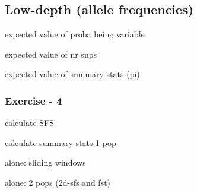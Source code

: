 
\subsection{Low-depth (allele frequencies)}

\begin{frame}

expected value of proba being variable

\end{frame}


\begin{frame}

expected value of nr snps

\end{frame}


\begin{frame}


\end{frame}


\begin{frame}

expected value of summary stats (pi)

\end{frame}


\begin{frame}
\frametitle{Exercise - 4}

calculate SFS

calculate summary stats 1 pop

alone: sliding windows

alone: 2 pops (2d-sfs and fst)

\end{frame}


